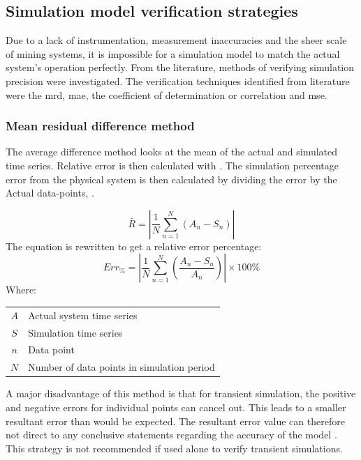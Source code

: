  	\subsection{Simulation model verification strategies}\label{VerificationLit}
 	Due to a lack of instrumentation, measurement inaccuracies and the sheer scale of mining systems, it is impossible for a simulation model to match the actual system's operation perfectly. From the literature, methods of verifying simulation precision were investigated. The verification techniques identified from literature were the \gls{mrd}, \gls{mae},  the coefficient of determination or correlation and \gls{mse}.%
 		\subsubsection{Mean residual difference method}
 			The average difference method looks at the mean of the actual and simulated time series. Relative error is then calculated with . The simulation percentage error from the physical system is then calculated by dividing the error by the Actual data-points, .
 			
 			\begin{equation}
 			\label{eq: AMean absolute}
 			\bar{R} = \left| \dfrac{1}{N} \sum_{n=1}^{N}{ \left( A_{n} - S_{n}\right)} \right|
 			\end{equation}
The equation is rewritten to get a relative error percentage:	
 			\begin{equation}
 				\label{eq: Average difference}
 				Err_{\%} = \left| \dfrac{1}{N} \sum_{n=1}^{N}{ \left(\dfrac{ A_{n} - S_{n}}{A_n}\right)} \right| \times 100 \%
 			\end{equation}
 			Where: \par 
 				\begin{table}[h!]
 					\centering
 					\begin{tabular}{cl}
 						$A$ & Actual system time series \\
 						$S$ & Simulation time series \\
 						$n$ & Data point \\
 						$N$ & Number of data points in simulation period \\
 					\end{tabular} 
 				\end{table}	
 			A major disadvantage of this method is that for transient simulation, the positive and negative errors for individual points can cancel out. This leads to a smaller resultant error than would be expected. The resultant error value can therefore not direct to any conclusive statements regarding the accuracy of the model \cite{sarin2010comparing}. This strategy is not recommended if used alone to verify transient simulations. 
 			\par 
 						

